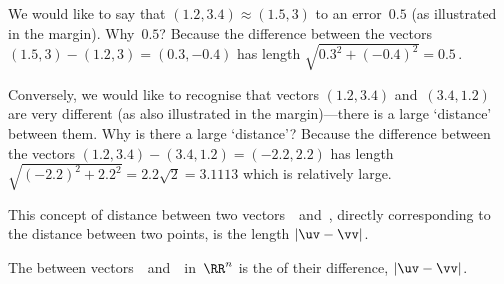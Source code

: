 \begin{example} \label{eg:}
We would like to say that \((1.2,3.4)\approx(1.5,3)\) to an error~\(0.5\) (as illustrated in the margin).
Why~\(0.5\)?  Because the difference between the vectors \((1.5,3)-(1.2,3)=(0.3,-0.4)\) has length \(\sqrt{0.3^2+(-0.4)^2}=0.5\)\,.

Conversely, we would like to recognise that vectors \((1.2,3.4)\) and~\((3.4,1.2)\) are very different (as also illustrated in the margin)---there is a large `distance' between them.
Why is there a large `distance'?  Because the difference between the vectors \((1.2,3.4)-(3.4,1.2)=(-2.2,2.2)\) has length \(\sqrt{(-2.2)^2+2.2^2}=2.2\sqrt2=3.1113\) which is relatively large.
\end{example}

This concept of distance between two vectors~\uv\ and~\vv, directly corresponding to the distance between two points, is the length \(|\uv-\vv|\).

\begin{definition} \label{def:vecdist}
The  between vectors~\uv\ and~\vv\ in~\(\RR^n\) is the  of their difference, \(|\uv-\vv|\).
\end{definition}



